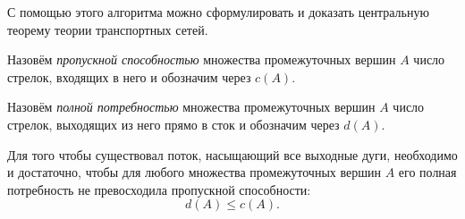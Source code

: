 	С помощью этого алгоритма можно сформулировать и доказать центральную теорему теории транспортных сетей. 
	
\begin{definition}
	Назовём \emph{пропускной способностью} множества промежуточных вершин $A$ число стрелок, входящих в него и обозначим через $c(A)$.
\end{definition}

\begin{definition}
	Назовём \emph{полной потребностью} множества промежуточных вершин $A$ число стрелок, выходящих из него прямо в сток и обозначим через $d(A)$.
\end{definition}

\begin{theorem}[Гэйла]
	Для того чтобы существовал поток, насыщающий все выходные дуги, необходимо и достаточно, чтобы для любого множества промежуточных вершин $A$ его полная потребность не превосходила пропускной способности: $$d(A) \leqslant c(A).$$
\end{theorem}

%

